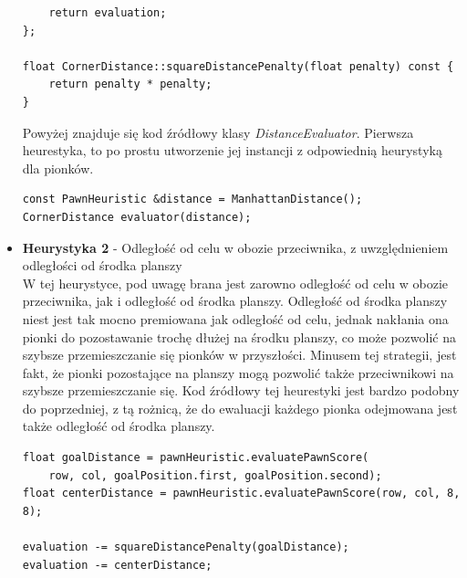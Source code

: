 \documentclass[a4paper, 12pt]{article}
\begin{document}
\begin{itemize}
\begin{lstlisting}
    return evaluation;
};

float CornerDistance::squareDistancePenalty(float penalty) const {
    return penalty * penalty;
}
\end{lstlisting}
Powyżej znajduje się kod źródłowy klasy \textit{DistanceEvaluator}.
Pierwsza heurestyka, to po prostu utworzenie jej instancji 
z odpowiednią heurystyką dla pionków.
\begin{lstlisting}
const PawnHeuristic &distance = ManhattanDistance();
CornerDistance evaluator(distance);
\end{lstlisting}
\item \textbf{Heurystyka 2} - Odległość od celu w obozie przeciwnika, z uwzględnieniem 
odległości od środka planszy\\
W tej heurystyce, pod uwagę brana jest zarowno odległość od celu w obozie przeciwnika,
jak i odległość od środka planszy. Odległość od środka planszy niest jest 
tak mocno premiowana jak odległość od celu, jednak nakłania ona pionki do 
pozostawanie trochę dłużej na środku planszy, co może pozwolić na szybsze 
przemieszczanie się pionków w przyszłości. Minusem tej strategii,
jest fakt, że pionki pozostające na planszy mogą pozwolić także przeciwnikowi
na szybsze przemieszczanie się. Kod źródłowy tej heurestyki jest 
bardzo podobny do poprzedniej, z tą rożnicą, że do ewaluacji każdego pionka 
odejmowana jest także odległość od środka planszy.
\begin{lstlisting}
float goalDistance = pawnHeuristic.evaluatePawnScore(
    row, col, goalPosition.first, goalPosition.second);
float centerDistance = pawnHeuristic.evaluatePawnScore(row, col, 8, 8);

evaluation -= squareDistancePenalty(goalDistance);
evaluation -= centerDistance;
\end{lstlisting}

\end{itemize}
\end{document}
